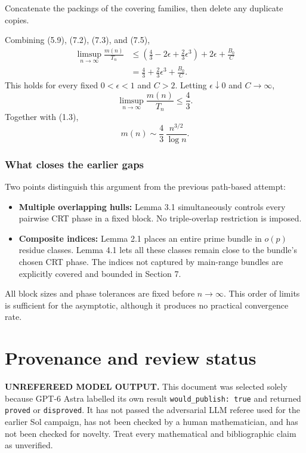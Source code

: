 \documentclass[
  11pt,
  a4paper,
]{article}
\providecommand{\tightlist}{%
  \setlength{\itemsep}{0pt}\setlength{\parskip}{0pt}}
\begin{document}
Concatenate the packings of the covering families, then delete any
duplicate copies.

Combining (5.9), (7.2), (7.3), and (7.5), \begin{equation*}
\begin{aligned}
\limsup_{n\to\infty}\frac{m(n)}{T_n}
&\le
\left(\frac43-2\epsilon+\frac23\epsilon^3\right)
+2\epsilon+\frac{B_0}{C}\\
&=
\frac43+\frac23\epsilon^3+\frac{B_0}{C}.
\end{aligned}
\end{equation*} This holds for every fixed \(0<\epsilon<1\) and \(C>2\).
Letting \(\epsilon\downarrow0\) and \(C\to\infty\), \[
\limsup_{n\to\infty}\frac{m(n)}{T_n}\le\frac43.
\] Together with (1.3), \[
\boxed{\displaystyle
m(n)\sim\frac43\,\frac{n^{3/2}}{\log n}.}
\]

\subsubsection{What closes the earlier
gaps}\label{what-closes-the-earlier-gaps}

Two points distinguish this argument from the previous path-based
attempt:

\begin{itemize}
\tightlist
\item
  \textbf{Multiple overlapping hulls:} Lemma 3.1 simultaneously controls
  every pairwise CRT phase in a fixed block. No triple-overlap
  restriction is imposed.
\item
  \textbf{Composite indices:} Lemma 2.1 places an entire prime bundle in
  \(o(p)\) residue classes. Lemma 4.1 lets all these classes remain
  close to the bundle's chosen CRT phase. The indices not captured by
  main-range bundles are explicitly covered and bounded in Section 7.
\end{itemize}

All block sizes and phase tolerances are fixed before \(n\to\infty\).
This order of limits is sufficient for the asymptotic, although it
produces no practical convergence rate.

\appendix

\section{Provenance and review
status}\label{provenance-and-review-status}

\begin{warning}

\textbf{UNREFEREED MODEL OUTPUT.} This document was selected solely
because GPT-6 Astra labelled its own result
\texttt{would\_publish:\ true} and returned \texttt{proved} or
\texttt{disproved}. It has not passed the adversarial LLM referee used
for the earlier Sol campaign, has not been checked by a human
mathematician, and has not been checked for novelty. Treat every
mathematical and bibliographic claim as unverified.

\end{warning}
\end{document}
